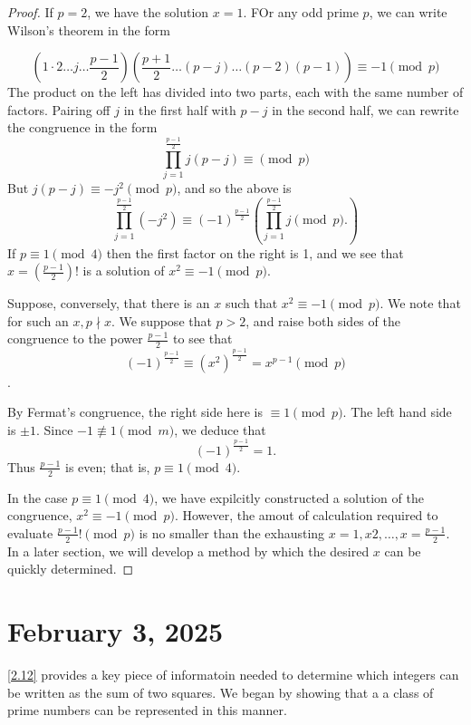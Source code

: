 \documentclass[11pt]{article}
\begin{document}
\begin{proof}
    If \(p = 2\), we have the solution \(x = 1\). FOr any odd prime \(p\), we can write Wilson's theorem in the form

    \[\left(1 \cdot 2 \ldots j \ldots \frac{p - 1}{2}\right)\left(\frac{p + 1}{2} \ldots (p - j) \ldots (p - 2)(p - 1)\right) \equiv -1 \pmod{p}\]
    The product on the left has divided into two parts, each with the same number
    of factors. Pairing off \(j\) in the first half with \(p - j\) in the second
    half, we can rewrite the congruence in the form
    \[\prod_{j = 1}^{\frac{p - 1}{2}} j (p - j)\equiv \pmod{p}\]
    But \(j(p - j) \equiv -j^2 \pmod{p}\), and so the above is
    \[\prod_{j = 1}^{\frac{p - 1}{2}}(-j^2) \equiv (-1)^{\frac{p - 1}{2}}\left(\prod_{j = 1}^{\frac{p - 1}{2}} j \pmod{p}.\right)\]
    If \(p \equiv 1 \pmod{4}\) then the first factor on the right is 1, and we see
    that \(x = \left(\frac{p - 1}{2}\right)!\) is a solution of \(x^2 \equiv -1
    \pmod{p}\).

    Suppose, conversely, that there is an \(x\) such that \(x^2 \equiv -1
    \pmod{p}\). We note that for such an \(x, p \nmid x\). We suppose that \(p >
    2\), and raise both sides of the congruence to the power \(\frac{p - 1}{2}\) to
    see that
    \[(-1)^\frac{p - 1}{2} \equiv (x^2)^{\frac{ p - 1}{2}} = x^{p - 1} \pmod{p}\].

    By Fermat's congruence, the right side here is \(\equiv 1 \pmod{p}\). The left
    hand side is \(\pm 1\). Since \(-1 \not \equiv 1 \pmod{m}\), we deduce that \[(-1)^{\frac{p - 1}{2}} = 1.\] Thus \(\frac{p - 1}{2}\) is even; that is, \(p \equiv 1 \pmod{4}\).

    In the case \(p \equiv 1 \pmod {4}\), we have expilcitly constructed a solution
    of the congruence, \(x^2 \equiv -1 \pmod{p}\). However, the amout of
    calculation required to evaluate \(\frac{p - 1}{2}! \pmod{p}\) is no smaller
    than the exhausting \(x = 1, x 2, \ldots, x = \frac{p - 1}{2}\). In a later
    section, we will develop a method by which the desired \(x\) can be quickly
    determined.
\end{proof}


\section{February 3, 2025}

\ref{2.12} provides a key piece of informatoin needed to determine
which integers can be written as the sum of two squares. We began by showing
that a a class of prime numbers can be represented in this manner.
\end{document}
